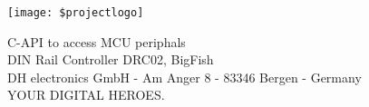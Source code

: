 \documentclass[oneside]{book}
\newcommand{\+}{\discretionary{\mbox{\scriptsize$\hookleftarrow$}}{}{}}
\newcommand{\clearemptydoublepage}{%
  \newpage{\pagestyle{empty}\cleardoublepage}%
}
\begin{document}
\hypersetup{pageanchor=false,
             bookmarksnumbered=true,
             pdfencoding=unicode
            }
\begin{titlepage}
\begin{flushright}%
\texttt{[image: \$projectlogo]}\\
\end{flushright}
\vspace*{7cm}
\begin{center}%
{\huge C-API to access MCU periphals}\\
\vspace*{1cm}
{\large DIN Rail Controller DRC02, BigFish}\\
\vspace*{2cm}
{\normalsize DH electronics GmbH - Am Anger 8 - 83346 Bergen - Germany}\\
\vfill 
{\large YOUR DIGITAL HEROES.}\\
\end{center}
\end{titlepage}
\clearemptydoublepage
{}
\tableofcontents
\clearemptydoublepage
{}
\hypersetup{pageanchor=true}

\end{document}

